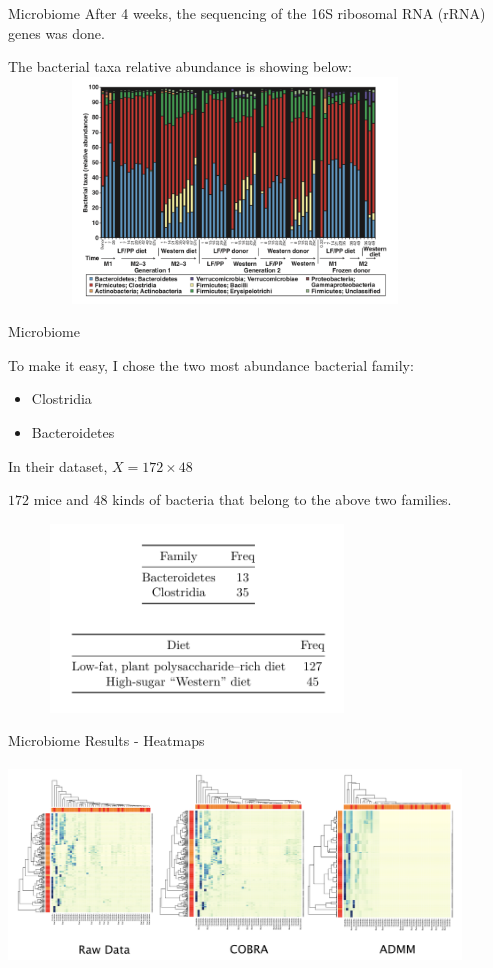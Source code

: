 \documentclass{beamer}
\begin{document}
\begin{frame}{Microbiome}
    After 4 weeks, the sequencing of the 16S ribosomal RNA (rRNA) genes was done. 
    
    The bacterial taxa relative abundance is showing below:
    \centering
    \includegraphics[width=12cm,height=6cm,keepaspectratio]{r1}
    
\end{frame}
 
\begin{frame}{Microbiome}

To make it easy, I chose the two most abundance bacterial family: 

\begin{itemize}
    \item Clostridia
    \item Bacteroidetes
\end{itemize}

In their dataset, $X = 172 \times 48$

$172$ mice and $48$ kinds of bacteria that belong to the above two families.

\vfill
\centering
    \includegraphics[width=10cm,height=5cm,keepaspectratio]{freq}
    
\end{frame}



\begin{frame}{Microbiome}
Results - Heatmaps
\centering
    \includegraphics[width=12cm,height=6cm,keepaspectratio]{real}
\end{frame}
\end{document}
